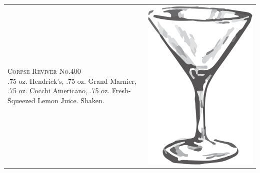 \documentclass{article}
\begin{document}
\begin{tabular}{*{2}{m{}}}
{\raggedleft\huge\textsc{Corpse Reviver No.400}\\*}
\raggedleft .75 oz. Hendrick's, .75 oz. Grand Marnier, .75 oz. Cocchi Americano, .75 oz. Fresh-Squeezed Lemon Juice. Shaken. & \includegraphics{goblet.png}\\
\end{tabular}
\end{document}
